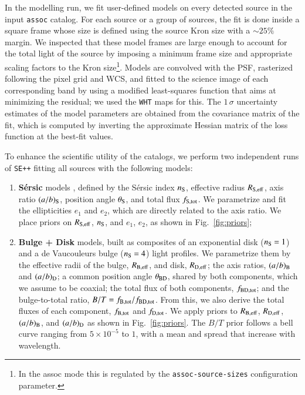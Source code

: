 \documentclass[longauth]{aa}
\begin{document}
In the modelling run, we fit user-defined models on every detected source in the input \texttt{assoc} catalog. For each source or a group of sources, the fit is done inside a square frame whose size is defined using the source Kron size with a  $\sim25\%$ margin. We inspected that these model frames are large enough to account for the total light of the source by imposing a minimum frame size and appropriate scaling factors to the Kron size\footnote{In the assoc mode this is regulated by the \texttt{assoc-source-sizes} configuration parameter.}. Models are convolved with the PSF, rasterized following the pixel grid and WCS, and fitted to the science image of each corresponding band by using a modified least-squares function that aims at minimizing the residual; we used the \texttt{WHT} maps for this. The $1\,\sigma$ uncertainty estimates of the model parameters are obtained from the covariance matrix of the fit, which is computed by inverting the approximate Hessian matrix of the loss function at the best-fit values.

To enhance the scientific utility of the catalogs, we perform two independent runs of \texttt{SE++} fitting all sources with the following models:

\begin{enumerate}
\item \textbf{S\'ersic} models \citep{Sersic1963}, defined by the S\'ersic index $n_{\rm S}$, effective radius $R_{\rm S, eff}$, axis ratio $(a/b)_{\rm S}$, position angle $\theta_{\rm S}$, and total flux $f_{\rm S, tot}$. We parametrize and fit the ellipticities $e_1$ and $e_2$, which are directly related to the axis ratio. We place priors on $R_{\rm S, eff}$, $n_{\rm S}$, and $e_1$, $e_2$, as shown in Fig.~\ref{fig:priors};

\item \textbf{Bulge + Disk} models, built as composites of an exponential disk ($n_{\rm S}=1$) and a de Vaucouleurs bulge ($n_{\rm S}=4$) light profiles. We parametrize them by the effective radii of the bulge, $R_{\rm B, eff}$, and disk, $R_{\rm D, eff}$; the axis ratios, $(a/b)_{\rm B}$ and $(a/b)_{\rm D}$; a common position angle $\theta_{\rm BD}$, shared by both components, which we assume to be coaxial; the total flux of both components, $f_{\rm BD, tot}$; and the bulge-to-total ratio, $B/T = f_{\rm B, tot}/f_{\rm BD, tot}$. From this, we also derive the total fluxes of each component, $f_{\rm B, tot}$ and $f_{\rm D, tot}$. We apply priors to $R_{\rm B, eff}$, $R_{\rm D, eff}$, $(a/b)_{\rm B}$, and $(a/b)_{\rm D}$ as shown in Fig.~\ref{fig:priors}. The $B/T$ prior follows a bell curve ranging from $5\times 10^{-5}$ to $1$, with a mean and spread that increase with wavelength.

\end{enumerate}
\end{document}
